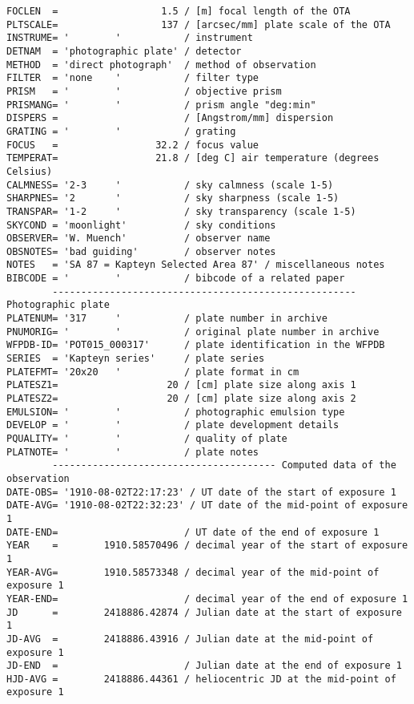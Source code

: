 \documentclass[11pt]{ivoa}
\begin{document}
\begin{lstlisting}
FOCLEN  =                  1.5 / [m] focal length of the OTA
PLTSCALE=                  137 / [arcsec/mm] plate scale of the OTA
INSTRUME= '        '           / instrument
DETNAM  = 'photographic plate' / detector
METHOD  = 'direct photograph'  / method of observation
FILTER  = 'none    '           / filter type
PRISM   = '        '           / objective prism
PRISMANG= '        '           / prism angle "deg:min"
DISPERS =                      / [Angstrom/mm] dispersion
GRATING = '        '           / grating
FOCUS   =                 32.2 / focus value
TEMPERAT=                 21.8 / [deg C] air temperature (degrees Celsius)
CALMNESS= '2-3     '           / sky calmness (scale 1-5)
SHARPNES= '2       '           / sky sharpness (scale 1-5)
TRANSPAR= '1-2     '           / sky transparency (scale 1-5)
SKYCOND = 'moonlight'          / sky conditions
OBSERVER= 'W. Muench'          / observer name
OBSNOTES= 'bad guiding'        / observer notes
NOTES   = 'SA 87 = Kapteyn Selected Area 87' / miscellaneous notes
BIBCODE = '        '           / bibcode of a related paper
        ----------------------------------------------------- Photographic plate
PLATENUM= '317     '           / plate number in archive
PNUMORIG= '        '           / original plate number in archive
WFPDB-ID= 'POT015_000317'      / plate identification in the WFPDB
SERIES  = 'Kapteyn series'     / plate series
PLATEFMT= '20x20   '           / plate format in cm
PLATESZ1=                   20 / [cm] plate size along axis 1
PLATESZ2=                   20 / [cm] plate size along axis 2
EMULSION= '        '           / photographic emulsion type
DEVELOP = '        '           / plate development details
PQUALITY= '        '           / quality of plate
PLATNOTE= '        '           / plate notes
        --------------------------------------- Computed data of the observation
DATE-OBS= '1910-08-02T22:17:23' / UT date of the start of exposure 1
DATE-AVG= '1910-08-02T22:32:23' / UT date of the mid-point of exposure 1
DATE-END=                      / UT date of the end of exposure 1
YEAR    =        1910.58570496 / decimal year of the start of exposure 1
YEAR-AVG=        1910.58573348 / decimal year of the mid-point of exposure 1
YEAR-END=                      / decimal year of the end of exposure 1
JD      =        2418886.42874 / Julian date at the start of exposure 1
JD-AVG  =        2418886.43916 / Julian date at the mid-point of exposure 1
JD-END  =                      / Julian date at the end of exposure 1
HJD-AVG =        2418886.44361 / heliocentric JD at the mid-point of exposure 1

\end{lstlisting}
\end{document}
